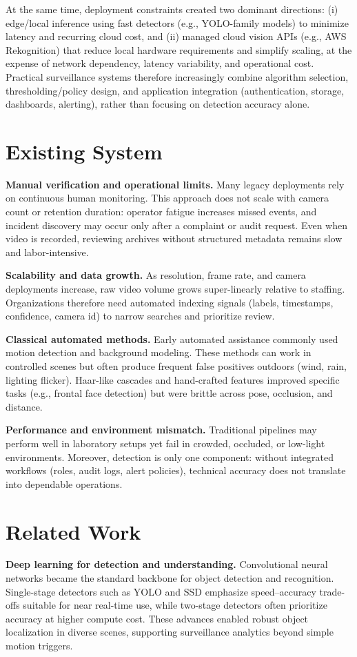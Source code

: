 \documentclass[10pt,openany]{report}
\begin{document}
\begin{sloppypar}
{{{\begin{sloppypar}
At the same time, deployment constraints created two dominant directions: (i) edge/local inference using fast detectors (e.g., YOLO-family models) to minimize latency and recurring cloud cost, and (ii) managed cloud vision APIs (e.g., AWS Rekognition) that reduce local hardware requirements and simplify scaling, at the expense of network dependency, latency variability, and operational cost. Practical surveillance systems therefore increasingly combine algorithm selection, thresholding/policy design, and application integration (authentication, storage, dashboards, alerting), rather than focusing on detection accuracy alone.

\section{Existing System}
\textbf{Manual verification and operational limits.} Many legacy deployments rely on continuous human monitoring. This approach does not scale with camera count or retention duration: operator fatigue increases missed events, and incident discovery may occur only after a complaint or audit request. Even when video is recorded, reviewing archives without structured metadata remains slow and labor-intensive.

\textbf{Scalability and data growth.} As resolution, frame rate, and camera deployments increase, raw video volume grows super-linearly relative to staffing. Organizations therefore need automated indexing signals (labels, timestamps, confidence, camera id) to narrow searches and prioritize review.

\textbf{Classical automated methods.} Early automated assistance commonly used motion detection and background modeling. These methods can work in controlled scenes but often produce frequent false positives outdoors (wind, rain, lighting flicker). Haar-like cascades and hand-crafted features improved specific tasks (e.g., frontal face detection) but were brittle across pose, occlusion, and distance.

\textbf{Performance and environment mismatch.} Traditional pipelines may perform well in laboratory setups yet fail in crowded, occluded, or low-light environments. Moreover, detection is only one component: without integrated workflows (roles, audit logs, alert policies), technical accuracy does not translate into dependable operations.

\section{Related Work}
\textbf{Deep learning for detection and understanding.} Convolutional neural networks became the standard backbone for object detection and recognition. Single-stage detectors such as YOLO and SSD emphasize speed--accuracy trade-offs suitable for near real-time use, while two-stage detectors often prioritize accuracy at higher compute cost. These advances enabled robust object localization in diverse scenes, supporting surveillance analytics beyond simple motion triggers.


\end{sloppypar}}}}
\end{sloppypar}
\end{document}
